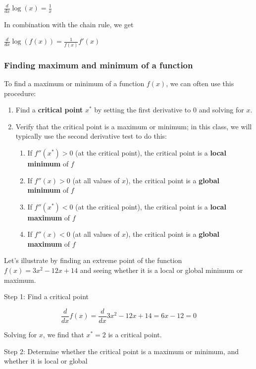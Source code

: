 \documentclass[]{article}
\providecommand{\tightlist}{%
  \setlength{\itemsep}{0pt}\setlength{\parskip}{0pt}}
\begin{document}
\(\frac{d}{dx} \log(x) = \frac{1}{x}\)

In combination with the chain rule, we get

\(\frac{d}{dx} \log(f(x)) = \frac{1}{f(x)} f'(x)\)

\subsubsection{Finding maximum and minimum of a
function}\label{finding-maximum-and-minimum-of-a-function}

To find a maximum or minimum of a function \(f(x)\), we can often use
this procedure:

\begin{enumerate}
\def\labelenumi{\arabic{enumi}.}
\tightlist
\item
  Find a \textbf{critical point} \(x^*\) by setting the first derivative
  to 0 and solving for \(x\).
\item
  Verify that the critical point is a maximum or minimum; in this class,
  we will typically use the second derivative test to do this:

  \begin{enumerate}
  \def\labelenumii{\arabic{enumii}.}
  \tightlist
  \item
    If \(f''(x^*) > 0\) (at the critical point), the critical point is a
    \textbf{local minimum} of \(f\)
  \item
    If \(f''(x) > 0\) (at all values of \(x\)), the critical point is a
    \textbf{global minimum} of \(f\)
  \item
    If \(f''(x^*) < 0\) (at the critical point), the critical point is a
    \textbf{local maximum} of \(f\)
  \item
    If \(f''(x) < 0\) (at all values of \(x\)), the critical point is a
    \textbf{global maximum} of \(f\)
  \end{enumerate}
\end{enumerate}

Let's illustrate by finding an extreme point of the function
\(f(x) = 3x^2 - 12x + 14\) and seeing whether it is a local or global
minimum or maximum.

Step 1: Find a critical point

\[\frac{d}{dx} f(x) = \frac{d}{dx} 3x^2 - 12x + 14 = 6x - 12 = 0\]

Solving for \(x\), we find that \(x^* = 2\) is a critical point.

Step 2: Determine whether the critical point is a maximum or minimum,
and whether it is local or global
\end{document}
